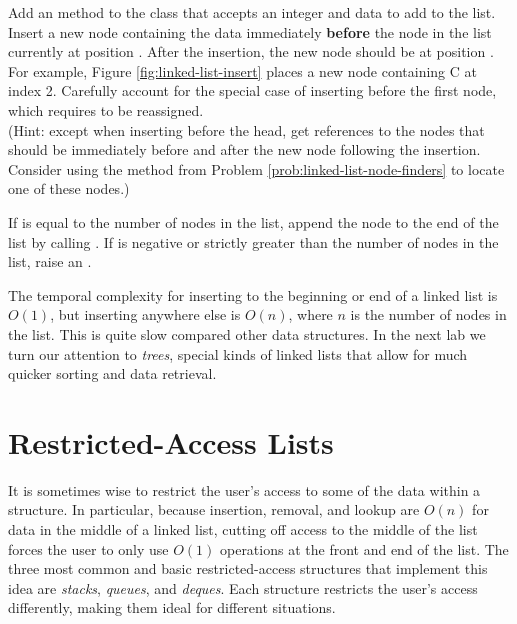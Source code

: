 \begin{problem} %
Add an  method to the  class that accepts an integer  and data to add to the list.
Insert a new node containing the data immediately \textbf{before} the node in the list currently at position .
After the insertion, the new node should be at position .
For example, Figure \ref{fig:linked-list-insert} places a new node containing C at index 2.
Carefully account for the special case of inserting before the first node, which requires  to be reassigned.
\\(Hint: except when inserting before the head, get references to the nodes that should be immediately before and after the new node following the insertion.
Consider using the  method from Problem \ref{prob:linked-list-node-finders} to locate one of these nodes.)

If  is equal to the number of nodes in the list, append the node to the end of the list by calling .
If  is negative or strictly greater than the number of nodes in the list, raise an .
\end{problem}

\begin{info} %
The temporal complexity for inserting to the beginning or end of a linked list is $O(1)$, but inserting anywhere else is $O(n)$, where $n$ is the number of nodes in the list.
This is quite slow compared other data structures.
In the next lab we turn our attention to \emph{trees}, special kinds of linked lists that allow for much quicker sorting and data retrieval.
\end{info}

\section*{Restricted-Access Lists} %

It is sometimes wise to restrict the user's access to some of the data within a structure.
In particular, because insertion, removal, and lookup are $O(n)$ for data in the middle of a linked list, cutting off access to the middle of the list forces the user to only use $O(1)$ operations at the front and end of the list.
The three most common and basic restricted-access structures that implement this idea are \emph{stacks}, \emph{queues}, and \emph{deques}.
Each structure restricts the user's access differently, making them ideal for different situations.

